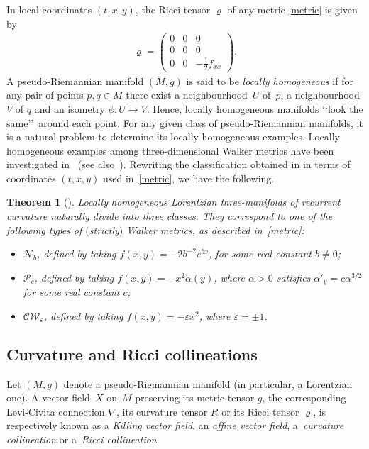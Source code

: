\documentclass[pdftex]{sigma}
\numberwithin{equation}{section}
\newtheorem{Theorem}{Theorem}[section]
\begin{document}
In local coordinates $(t,x,y)$, the Ricci tensor $\varrho$ of any metric \eqref{metric} is given by
\begin{gather}\label{Ricci}
\varrho = \left( \begin{matrix}
0 & 0 & 0 \\
0 & 0 & 0 \\
0 & 0 & -\frac{1}{2} f_{xx}
\end{matrix} \right).
\end{gather}
A pseudo-Riemannian manifold $(M,g)$ is said to be {\em locally homogeneous} if for any pair of points $p,q \in M$ there exist a neighbourhood~$U$ of~$p$, a neighbourhood $V$ of $q$ and an isometry $\phi\colon U\to V$. Hence, locally homogeneous manifolds \lq\lq look the same\rq\rq \ around each point. For any given class of pseudo-Riemannian manifolds, it is a natural problem to determine its locally homogeneous examples. {Locally homogeneous} examples among three-dimensional Walker metrics have been investigated in~\cite{GGN} (see also~\cite{BCL}). Rewriting the classif\/ication obtained in \cite{GGN} in terms of coordinates $(t,x,y)$ used in~\eqref{metric}, we have the following.

\begin{Theorem}[\cite{GGN}]\label{homex}
Locally homogeneous Lorentzian three-manifolds of recurrent curvature naturally divide into three classes. They correspond to one of the following types of $($strictly$)$ Walker metrics, as described in~\eqref{metric}:
\begin{itemize}\itemsep=0pt
\item[$I)$] $\mathcal N _b$, defined by taking $f(x,y)=-2b^{-2}e^{bx}$, for some real constant $b \neq 0$;
\item[$II)$] $\mathcal P _c$, defined by taking $f(x,y)=-x^{2}\alpha (y)$, where $\alpha >0$ satisfies {$\alpha ' _y=c \alpha^{3/2}$} for some real constant $c$;
\item[$III)$] $\mathcal{CW} _{\varepsilon}$, defined by taking $f(x,y)=-\varepsilon x^2$, where $\varepsilon =\pm 1$.
\end{itemize}
\end{Theorem}

\subsection{Curvature and Ricci collineations}

Let $(M,g)$ denote a pseudo-Riemannian manifold (in particular, a Lorentzian one). A vector f\/ield~$X$ on~$M$ preserving its metric tensor $g$, the corresponding Levi-Civita connection $\nabla$, its curvature tensor $R$ or its Ricci tensor $\varrho$, is respectively known as a {\em Killing vector field}, an {\em affine vector field}, a~{\em curvature collineation} or a~{\em Ricci collineation}.
\end{document}
